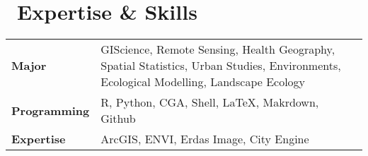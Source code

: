 \section{\texorpdfstring{\faLaptop\ Expertise \& Skills}{Expertise \& Skills}}
\begin{tabular}{p{} p{}}
\textbf{Major} & GIScience, Remote Sensing, Health Geography, Spatial Statistics, Urban Studies, Environments, Ecological Modelling, Landscape Ecology\\
\textbf{Programming} & R, Python, CGA, Shell, LaTeX, Makrdown, Github \\
\textbf{Expertise} & ArcGIS, ENVI, Erdas Image, City Engine \\
\end{tabular}
